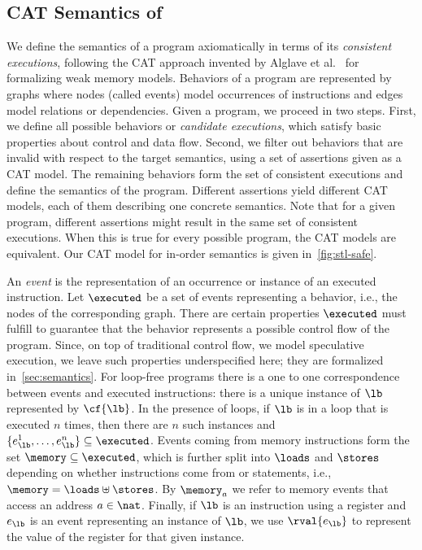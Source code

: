 \documentclass[conference]{IEEEtran}
\begin{document}
\subsection{CAT Semantics of \masm}
\label{sec:exec}

We define the semantics of a program axiomatically in terms of its \emph{consistent executions}, following the CAT approach invented by Alglave et al.~\cite{cat,AlglaveMT14} for formalizing weak memory models. 
Behaviors of a program are represented by graphs where nodes (called events) model occurrences of instructions and edges model relations or dependencies.
Given a program, we proceed in two steps.
First, we define all possible behaviors or \emph{candidate executions}, which satisfy basic properties about control and data flow.
Second, we filter out behaviors that are invalid with respect to the target semantics, using a set of assertions given as a CAT model. 
The remaining behaviors form the set of consistent executions and define the semantics of the program.
Different assertions yield different CAT models, each of them describing one concrete semantics. Note that for a given program, different assertions might result in the same set of consistent executions. When this is true for every possible program, the CAT models are equivalent. 
Our CAT model for in-order semantics is given in~\autoref{fig:stl-safe}.

An \emph{event} is the representation of an occurrence or instance of an executed instruction.
Let $\executed$ be a set of events representing a behavior, i.e., the nodes of the corresponding graph.
There are certain properties $\executed$ must fulfill to guarantee that the behavior represents a possible control flow of the program.
Since, on top of traditional control flow, we model speculative execution, we leave such properties underspecified here; they are formalized in~\autoref{sec:semantics}.
For loop-free programs there is a one to one correspondence between events and executed instructions: there is a unique instance of $\lb$ represented by $\cf{\lb}$.
In the presence of loops, if $\lb$ is in a loop that is executed $n$ times, then there are $n$ such instances and $\{ e^1_\lb, \dots, e^n_\lb \} \subseteq \executed$.
Events coming from memory instructions form the set $\memory \subseteq \executed$, which is further split into $\loads$ and $\stores$ depending on whether instructions come from \load or \store statements, i.e., $\memory = \loads \uplus \stores$.
By $\memory_a$ we refer to memory events that access an address $a \in \nat$.
Finally, if $\lb$ is an instruction using a register and $e_\lb$ is an event representing an instance of $\lb$, we use $\rval{e_\lb}$ to represent the value of the register for that given instance.
\end{document}
